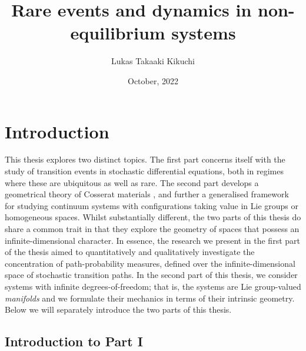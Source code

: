 \documentclass[]{cam-thesis}
\title{Rare events and dynamics in non-equilibrium systems}
\author{Lukas Takaaki Kikuchi}
\date{October, 2022}
\begin{document}
\frontmatter{}









\chapter*{Introduction}

This thesis explores two distinct topics. The first part concerns itself with the study of transition events in stochastic differential equations, both in regimes where these are ubiquitous as well as rare. The second part develops a geometrical theory of Cosserat materials \citep{cosseratTheoryDeformableBodies1909}, and further a generalised framework for studying continuum systems with configurations taking value in Lie groups or homogeneous spaces. Whilst substantially different, the two parts of this thesis do share a common trait in that they explore the geometry of spaces that possess an infinite-dimensional character. In essence, the research we present in the first part of the thesis aimed to quantitatively and qualitatively investigate the concentration of path-probability measures, defined over the infinite-dimensional space of stochastic transition paths. In the second part of this thesis, we consider systems with infinite degrees-of-freedom; that is, the systems are Lie group-valued \textit{manifolds} and we formulate their mechanics in terms of their intrinsic geometry. Below we will separately introduce the two parts of this thesis.

\section*{Introduction to Part I}
\end{document}
